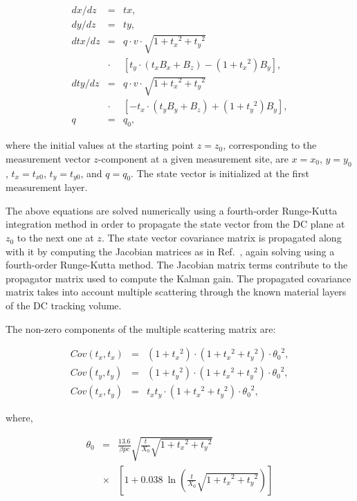 \begin{eqnarray}
dx/dz  &=& tx, \nonumber \\
dy/dz  &=&  ty, \nonumber \\
dtx/dz &=& q \cdot v \cdot \sqrt{1 + {t_x}^2 + {t_y}^2}  \nonumber \\
       &\cdot&\!\!\!\!\! [t_y\cdot (t_x B_x + B_z) - (1 + {t_x}^2 ) B_y],  \nonumber \\
dty/dz  &=&  q \cdot v \cdot \sqrt{1 + {t_x}^2 + {t_y}^2} \nonumber \\
      &\cdot&\!\!\!\!\! [-t_x\cdot (t_y B_y + B_z) + (1 + {t_y}^2 ) B_y], \nonumber \\
q  &=&  q_0,
\end{eqnarray}

\noindent
where the initial values at the starting point $z = z_0$, corresponding to the measurement vector $z$-component at
a given measurement site,  are $x = x_0$, $y = y_0$, $t_x = t_{x0}$, $t_y = t_{y0}$, and $q = q_0$.  The state vector
is initialized at the first measurement layer. 

The above equations are solved numerically using a fourth-order Runge-Kutta integration method in order to
propagate the state vector from the DC plane at $z_0$ to the next one at $z$.  The state vector covariance
matrix is propagated along with it by computing the Jacobian matrices as in Ref.~\cite{spiri}, again solving using
a fourth-order Runge-Kutta method. The Jacobian matrix terms contribute to the propagator matrix used to
compute the Kalman gain. The propagated covariance matrix takes into account multiple scattering through the
known material layers of the DC tracking volume.

The non-zero components of the multiple scattering matrix are:

\begin{eqnarray}
Cov (t_x , t_x) &=& (1+{t_x}^2 )\cdot (1+{t_x}^2 + {t_y}^2 )\cdot {\theta_0}^2 , \nonumber \\
Cov (t_y , t_y) &=& (1+{t_y}^2 )\cdot (1+{t_x}^2 + {t_y}^2 )\cdot {\theta_0}^2 , \nonumber \\
Cov (t_x , t_y) &=&  t_x t_y\cdot (1+{t_x}^2 + {t_y}^2 )\cdot {\theta_0}^2 ,
\end{eqnarray}

\noindent
where,

\begin{eqnarray}
  {\theta_0} &=& \frac{13.6}{\beta pc}\sqrt{\frac{t}{X_0}\sqrt{1+{t_x}^2+{t_y}^2}}\\
  &\times&\left[ {1+0.038~\ln \left({\frac{t}{X_0}\sqrt{1+{t_x}^2+{t_y}^2}}\right) }\right] \nonumber
\end{eqnarray}

